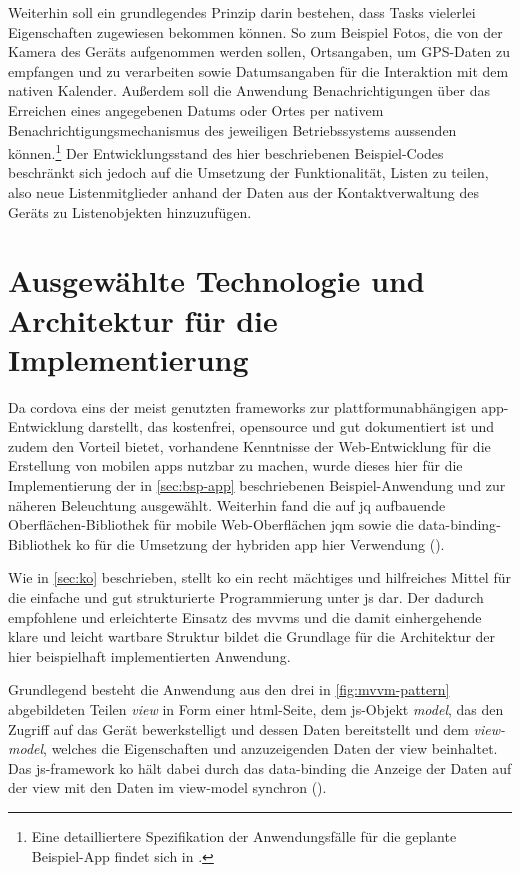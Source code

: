 Weiterhin soll ein grundlegendes Prinzip darin bestehen, dass Tasks vielerlei Eigenschaften zugewiesen bekommen können.
So zum Beispiel Fotos, die von der Kamera des Geräts aufgenommen werden sollen, Ortsangaben, um GPS-Daten zu empfangen und zu verarbeiten sowie Datumsangaben für die Interaktion mit dem nativen Kalender.
Außerdem soll die Anwendung Benachrichtigungen über das Erreichen eines angegebenen Datums oder Ortes per nativem Benachrichtigungsmechanismus des jeweiligen Betriebssystems aussenden können.\footnote{Eine detailliertere Spezifikation der Anwendungsfälle für die geplante Beispiel-App findet sich in .}
Der Entwicklungsstand des hier beschriebenen Beispiel-Codes beschränkt sich jedoch auf die Umsetzung der \og Funktionalität, Listen zu teilen, also neue Listenmitglieder anhand der Daten aus der Kontaktverwaltung des Geräts zu Listenobjekten hinzuzufügen.

\section{Ausgewählte Technologie und Architektur für die Implementierung}

Da \gls{cordova} eins der meist genutzten \glspl{framework} zur plattformunabhängigen \gls{app}-Entwicklung darstellt, das kostenfrei, \gls{opensource} und gut dokumentiert ist und zudem den Vorteil bietet, vorhandene Kenntnisse der Web-Entwicklung für die Erstellung von mobilen \glspl{app} nutzbar zu machen, wurde dieses hier für die Implementierung der in \autoref{sec:bsp-app} beschriebenen Beispiel-Anwendung und zur näheren Beleuchtung ausgewählt.
Weiterhin fand die auf \gls{jq} aufbauende Oberflächen-Bibliothek für mobile Web-Oberflächen \gls{jqm} sowie die \gls{data-binding}-Bibliothek \gls{ko} für die Umsetzung der hybriden \gls{app} hier Verwendung ().

Wie in \autoref{sec:ko} beschrieben, stellt \gls{ko} ein recht mächtiges und hilfreiches Mittel für die einfache und gut strukturierte Programmierung unter \gls{js} dar.
Der dadurch empfohlene und erleichterte Einsatz des \glspl{mvvm} und die damit einhergehende klare und leicht wartbare Struktur bildet die Grundlage für die Architektur der hier beispielhaft implementierten Anwendung.
	
Grundlegend besteht die Anwendung aus den drei in \autoref{fig:mvvm-pattern} abgebildeten Teilen \emph{\gls{view}} in Form einer \gls{html}-Seite, dem \gls{js}-Objekt \emph{\gls{model}}, das den Zugriff auf das Gerät bewerkstelligt und dessen Daten bereitstellt und dem \emph{\gls{view-model}}, welches die Eigenschaften und anzuzeigenden Daten der \gls{view} beinhaltet.
Das \gls{js}-\gls{framework} \gls{ko} hält dabei durch das \gls{data-binding} die Anzeige der Daten auf der \gls{view} mit den Daten im \gls{view-model} synchron ().

